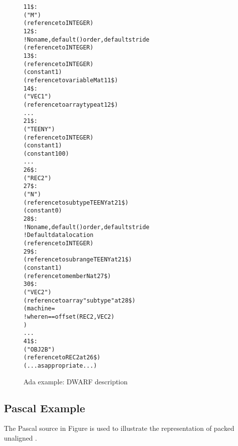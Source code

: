 \begin{figure}[p]
\begin{dwflisting}
\begin{alltt}
11\$: \DWTAGvariable
        \DWATname("M")
        \DWATtype(reference to INTEGER)
12\$: \DWTAGarraytype
        ! No name, default () order, default stride
        \DWATtype(reference to INTEGER)
13\$:    \DWTAGsubrangetype
            \DWATtype(reference to INTEGER)
            \DWATlowerbound(constant 1)
            \DWATupperbound(reference to variable M at 11\$)
14\$: \DWTAGvariable
        \DWATname("VEC1")
        \DWATtype(reference to array type at 12\$)
     . . .
21\$: \DWTAGsubrangetype
        \DWATname("TEENY")
        \DWATtype(reference to INTEGER)
        \DWATlowerbound(constant 1)
        \DWATupperbound(constant 100)
     . . .
26\$: \DWTAGstructuretype
        \DWATname("REC2")
27\$:    \DWTAGmember
            \DWATname("N")
            \DWATtype(reference to subtype TEENY at 21\$)
            \DWATdatamemberlocation(constant 0)
28\$:    \DWTAGarraytype
            ! No name, default () order, default stride
            ! Default data location
            \DWATtype(reference to INTEGER)
29\$:        \DWTAGsubrangetype
                \DWATtype(reference to subrange TEENY at 21\$)
                \DWATlowerbound(constant 1)
                \DWATupperbound(reference to member N at 27\$)
30\$:    \DWTAGmember
            \DWATname("VEC2")
            \DWATtype(reference to array "subtype" at 28\$)
            \DWATdatamemberlocation(machine=
                \DWOPlitn                  ! where n == offset(REC2, VEC2)
                \DWOPplus)
     . . .
41\$: \DWTAGvariable
        \DWATname("OBJ2B")
        \DWATtype(reference to REC2 at 26\$)
        \DWATlocation(...as appropriate...)
\end{alltt}
\end{dwflisting}
\caption{Ada example: DWARF description}
\label{fig:adaexampledwarfdescription}
\end{figure}

\clearpage

\subsection{Pascal Example}
\label{app:pascalexample}
The Pascal  source in 
Figure 
is used to illustrate the representation of packed unaligned
.

